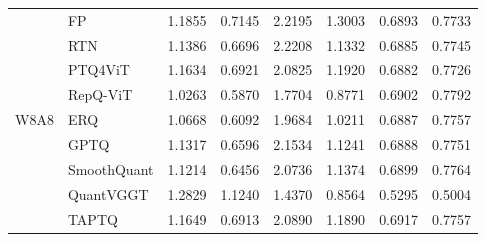 \documentclass[journal]{Tail_Aware_Post_Training_Quantization_for_3D_Geometry_Models_TMM/IEEEtran}
\newcommand{\taptq}{\textsc{TAPTQ}}
\begin{document}
\begin{table}[t]
\begin{tabular}{clrrrrrr}
\midrule
\multirow{9}{*}{W8A8}
& FP & 1.1855 & 0.7145 & 2.2195 & 1.3003 & 0.6893 & 0.7733 \\
& RTN & 1.1386 & 0.6696 & 2.2208 & 1.1332 & 0.6885 & 0.7745 \\
& PTQ4ViT & 1.1634 & 0.6921 & 2.0825 & 1.1920 & 0.6882 & 0.7726 \\
& RepQ-ViT & 1.0263 & 0.5870 & 1.7704 & 0.8771 & 0.6902 & 0.7792 \\
& ERQ & 1.0668 & 0.6092 & 1.9684 & 1.0211 & 0.6887 & 0.7757 \\
& GPTQ & 1.1317 & 0.6596 & 2.1534 & 1.1241 & 0.6888 & 0.7751 \\
& SmoothQuant & 1.1214 & 0.6456 & 2.0736 & 1.1374 & 0.6899 & 0.7764 \\
& QuantVGGT & 1.2829 & 1.1240 & 1.4370 & 0.8564 & 0.5295 & 0.5004 \\
& \taptq{} & 1.1649 & 0.6913 & 2.0890 & 1.1890 & 0.6917 & 0.7757 \\
\bottomrule
\end{tabular}
\end{table}
\end{document}
